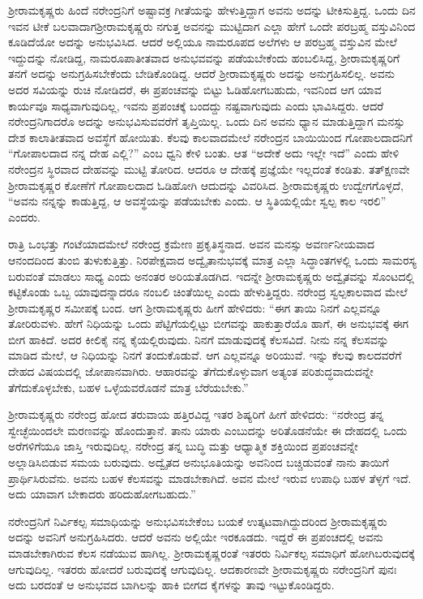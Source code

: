 ಶ‍್ರೀರಾಮಕೃಷ್ಣರು ಹಿಂದೆ ನರೇಂದ್ರನಿಗೆ ಅಷ್ಟಾವಕ್ರ ಗೀತೆಯನ್ನು ಹೇಳುತ್ತಿ\-ದ್ದಾಗ ಅವನು ಅದನ್ನು ಟೀಕಿಸುತ್ತಿದ್ದ. ಒಂದು ದಿನ ಇವನ ಟೀಕೆ ಬಲವಾದಾಗ\break ಶ‍್ರೀರಾಮಕೃಷ್ಣರು ನಗುತ್ತ ಅವನನ್ನು ಮುಟ್ಟಿದಾಗ ಎಲ್ಲಾ ಹೇಗೆ ಒಂದೇ ಪರಬ್ರಹ್ಮ ವಸ್ತುವಿನಿಂದ ಕೂಡಿದೆಯೋ ಅದನ್ನು ಅನುಭವಿಸಿದ. ಆದರೆ ಅಲ್ಲಿಯೂ ನಾಮರೂಪದ ಅಲೆಗಳು ಆ ಪರಬ್ರಹ್ಮ ವಸ್ತುವಿನ ಮೇಲೆ ಇದ್ದುದನ್ನು ನೋಡಿದ್ದ, ನಾಮರೂಪಾತೀತವಾದ ಅನುಭವವನ್ನು ಪಡೆಯಬೇಕೆಂದು ಹಂಬಲಿಸಿದ್ದ, ಶ‍್ರೀರಾಮಕೃಷ್ಣ\-ರಿಗೆ ತನಗೆ ಅದನ್ನು ಅನುಗ್ರಹಿಸಬೇಕೆಂದು ಬೇಡಿಕೊಂಡಿದ್ದ. ಆದರೆ ಶ‍್ರೀರಾಮಕೃಷ್ಣರು ಅದನ್ನು ಅನುಗ್ರಹಿಸಲಿಲ್ಲ. ಅವನು ಅದರ ಸವಿಯನ್ನು ರುಚಿ ನೋಡಿದರೆ, ಈ ಪ್ರಪಂಚವನ್ನು ಬಿಟ್ಟು ಓಡಿಹೋಗಬಹುದು, ಇವನಿಂದ ಆಗ ಯಾವ ಕಾರ್ಯವೂ ಸಾಧ್ಯವಾಗುವುದಿಲ್ಲ, ಇವನು ಪ್ರಪಂಚಕ್ಕೆ ಬಂದದ್ದು ನಷ್ಟವಾಗುವುದು ಎಂದು ಭಾವಿಸಿದ್ದರು. ಆದರೆ ನರೇಂದ್ರನಿಗಾದರೊ ಅದನ್ನು ಅನುಭವಿಸುವವರೆಗೆ ತೃಪ್ತಿಯಿಲ್ಲ. ಒಂದು ದಿನ ಅವನು ಧ್ಯಾನ ಮಾಡುತ್ತಿದ್ದಾಗ ಮನಸ್ಸು ದೇಶ ಕಾಲಾತೀತವಾದ ಅವಸ್ಥೆಗೆ ಹೋಯಿತು. ಕೆಲವು ಕಾಲವಾದಮೇಲೆ ನರೇಂದ್ರನ ಬಾಯಿಯಿಂದ ಗೋಪಾಲದಾದನಿಗೆ “ಗೋಪಾಲದಾದ ನನ್ನ ದೇಹ ಎಲ್ಲಿ?” ಎಂಬ ಧ್ವನಿ ಕೇಳಿ ಬಂತು. ಆತ “ಅದೇಕೆ ಅದು ಇಲ್ಲೇ ಇದೆ” ಎಂದು ಹೇಳಿ ನರೇಂದ್ರನ ಸ್ಥಿರವಾದ ದೇಹವನ್ನು ಮುಟ್ಟಿ ತೋರಿದ. ಆದರೂ ಆ ದೇಹಕ್ಕೆ ಪ್ರಜ್ಞೆಯೇ ಇಲ್ಲದಂತೆ ಕಂಡಿತು. ತತ್‍ಕ್ಷಣವೇ ಶ‍್ರೀರಾಮಕೃಷ್ಣರ ಕೋಣೆಗೆ ಗೋಪಾಲದಾದ ಓಡಿಹೋಗಿ ಆದುದನ್ನು ವಿವರಿಸಿದ. ಶ‍್ರೀರಾಮಕೃಷ್ಣರು ಉದ್ವೇಗಗೊಳ್ಳದೆ, “ಅವನು ನನ್ನನ್ನು ಕಾಡುತ್ತಿದ್ದ, ಆ ಅವಸ್ಥೆಯನ್ನು ಪಡೆಯಬೇಕು ಎಂದು. ಆ ಸ್ಥಿತಿಯಲ್ಲಿಯೇ ಸ್ವಲ್ಪ ಕಾಲ ಇರಲಿ” ಎಂದರು.

ರಾತ್ರಿ ಒಂಭತ್ತು ಗಂಟೆಯಾದಮೇಲೆ ನರೇಂದ್ರ ಕ್ರಮೇಣ ಪ್ರಕೃತಿಸ್ಥನಾದ. ಅವನ ಮನಸ್ಸು ಅವರ್ಣನೀಯವಾದ ಆನಂದದಿಂದ ತುಂಬಿ ತುಳುಕುತ್ತಿತ್ತು. ನಿರಪೇಕ್ಷವಾದ ಅದ್ವೈತಾನುಭವಕ್ಕೆ ಮಾತ್ರ ಎಲ್ಲಾ ಸಿದ್ಧಾಂತಗಳಲ್ಲಿ ಒಂದು ಸಾಮರಸ್ಯ ಬರುವಂತೆ ಮಾಡಲು ಸಾಧ್ಯ ಎಂದು ಅನಂತರ ಅರಿಯತೊಡಗಿದ. ಇದನ್ನೇ ಶ‍್ರೀರಾಮಕೃಷ್ಣರು ಅದ್ವೈತವನ್ನು ಸೊಂಟದಲ್ಲಿ ಕಟ್ಟಿಕೊಂಡು ಒಬ್ಬ ಯಾವುದನ್ನಾದರೂ ನಂಬಲಿ ಚಿಂತೆಯಿಲ್ಲ ಎಂದು ಹೇಳುತ್ತಿದ್ದರು. ನರೇಂದ್ರ ಸ್ವಲ್ಪಕಾಲವಾದ ಮೇಲೆ ಶ‍್ರೀರಾಮಕೃಷ್ಣರ ಸಮೀಪಕ್ಕೆ ಬಂದ. ಆಗ ಶ‍್ರೀರಾಮಕೃಷ್ಣರು ಹೀಗೆ ಹೇಳಿದರು: “ಈಗ ತಾಯಿ ನಿನಗೆ ಎಲ್ಲವನ್ನೂ ತೋರಿರುವಳು. ಹೇಗೆ ನಿಧಿಯನ್ನು ಒಂದು ಪೆಟ್ಟಿಗೆಯಲ್ಲಿಟ್ಟು ಬೀಗವನ್ನು ಹಾಕುತ್ತಾರೆಯೊ ಹಾಗೆ, ಈ ಅನುಭವಕ್ಕೆ ಈಗ ಬೀಗ ಹಾಕಿದೆ. ಅದರ ಕೀಲಿಕೈ ನನ್ನ ಕೈಯಲ್ಲಿರುವುದು. ನಿನಗೆ ಮಾಡುವುದಕ್ಕೆ ಕೆಲಸವಿದೆ. ನೀನು ನನ್ನ ಕೆಲಸವನ್ನು ಮಾಡಿದ ಮೇಲೆ, ಆ ನಿಧಿಯನ್ನು ನಿನಗೆ ತಂದುಕೊಡುವೆ. ಆಗ ಎಲ್ಲವನ್ನೂ ಅರಿಯುವೆ. ಇನ್ನು ಕೆಲವು ಕಾಲದವರೆಗೆ ದೇಹದ ವಿಷಯದಲ್ಲಿ ಜೋಪಾನವಾಗಿರು. ಆಹಾರವನ್ನು ತೆಗೆದುಕೊಳ್ಳುವಾಗ ಅತ್ಯಂತ ಪರಿಶುದ್ಧವಾದುದನ್ನೇ ತೆಗೆದುಕೊಳ್ಳಬೇಕು, ಬಹಳ ಒಳ್ಳೆಯವರೊಡನೆ ಮಾತ್ರ ಬೆರೆಯಬೇಕು.”

ಶ‍್ರೀರಾಮಕೃಷ್ಣರು ನರೇಂದ್ರ ಹೋದ ತರುವಾಯ ಹತ್ತಿರವಿದ್ದ ಇತರ ಶಿಷ್ಯರಿಗೆ ಹೀಗೆ ಹೇಳಿದರು: “ನರೇಂದ್ರ ತನ್ನ ಸ್ವೇಚ್ಛೆಯಿಂದಲೇ ಮರಣವನ್ನು ಹೊಂದುತ್ತಾನೆ. ತಾನು ಯಾರು ಎಂಬುದನ್ನು ಅರಿತೊಡನೆಯೇ ಈ ದೇಹದಲ್ಲಿ ಒಂದು ಅರೆಗಳಿಗೆಯೂ ಜಾಸ್ತಿ ಇರುವುದಿಲ್ಲ. ನರೇಂದ್ರ ತನ್ನ ಬುದ್ಧಿ ಮತ್ತು ಆಧ್ಯಾತ್ಮಿಕ ಶಕ್ತಿಯಿಂದ ಪ್ರಪಂಚವನ್ನೇ ಅಲ್ಲಾಡಿಸಿಬಿಡುವ ಸಮಯ ಬರುವುದು. ಅದ್ವೈತದ ಅನುಭೂತಿಯನ್ನು ಅವನಿಂದ ಬಚ್ಚಿಡುವಂತೆ ನಾನು ತಾಯಿಗೆ ಪ್ರಾರ್ಥಿಸಿರುವೆನು. ಅವನು ಬಹಳ ಕೆಲಸವನ್ನು ಮಾಡಬೇಕಾಗಿದೆ. ಅವನ ಮೇಲೆ ಇರುವ ಉಪಾಧಿ ಬಹಳ ತೆಳ್ಳಗೆ ಇದೆ. ಅದು ಯಾವಾಗ ಬೇಕಾದರು ಹರಿದುಹೋಗಬಹುದು.”

ನರೇಂದ್ರನಿಗೆ ನಿರ್ವಿಕಲ್ಪ ಸಮಾಧಿಯನ್ನು ಅನುಭವಿಸಬೇಕೆಂಬ ಬಯಕೆ ಉತ್ಕಟವಾಗಿದ್ದುದರಿಂದ ಶ‍್ರೀರಾಮಕೃಷ್ಣರು ಅದನ್ನು ಅವನಿಗೆ ಅನುಗ್ರಹಿಸಿದರು. ಆದರೆ ಅವನು ಅಲ್ಲಿಯೇ ಇರಕೂಡದು. ಇದ್ದರೆ ಈ ಪ್ರಪಂಚದಲ್ಲಿ ಅವನು ಮಾಡಬೇಕಾಗಿರುವ ಕೆಲಸ ನಡೆಯುವ ಹಾಗಿಲ್ಲ. ಶ‍್ರೀರಾಮಕೃಷ್ಣರಂತೆ ಇತರರು ನಿರ್ವಿಕಲ್ಪ ಸಮಾಧಿಗೆ ಹೋಗಿಬರುವುದಕ್ಕೆ ಆಗುವುದಿಲ್ಲ. ಇತರರು ಹೋದರೆ ಬರುವುದಕ್ಕೆ ಆಗುವುದಿಲ್ಲ. ಆದಕಾರಣವೇ ಶ‍್ರೀರಾಮಕೃಷ್ಣರು ನರೇಂದ್ರನಿಗೆ ಪುನಃ ಅದು ಬರದಂತೆ ಆ ಅನುಭವದ ಬಾಗಿಲನ್ನು ಹಾಕಿ ಬೀಗದ ಕೈಗಳನ್ನು ತಾವು ಇಟ್ಟುಕೊಂಡಿದ್ದರು.

